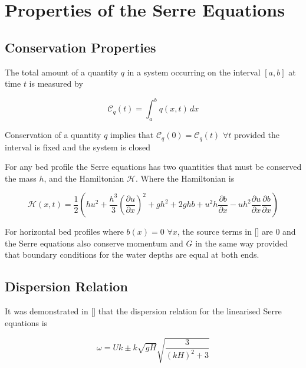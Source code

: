 \section{Properties of the Serre Equations}


\subsection{Conservation Properties}

The total amount of a quantity $q$ in a system occurring on the interval $[a,b]$ at time $t$ is measured by
\begin{defn}
	\label{defn:TotalAmmountab}
	\begin{equation*}
	\mathcal{C}_q(t) = \int_{a}^{b} q(x,t)\, dx
	\end{equation*}
\end{defn}
Conservation of a quantity $q$ implies that $\mathcal{C}_{q}(0) = \mathcal{C}_{q}(t)$ $\forall t$ provided the interval is fixed and the system is closed



For any bed profile the Serre equations has two quantities that must be conserved the mass $h$, and the Hamiltonian $\mathcal{H}$. Where the Hamiltonian is

\begin{defn}
	\label{eqn:Hamildef}
	\begin{equation*}
		\mathcal{H}(x,t) = \frac{1}{2} \left(hu^2 + \frac{h^3}{3} \left(\frac{\partial u}{\partial x}\right)^2 + gh^2 + 2ghb + u^2h\frac{\partial b}{\partial x} - uh^2 \frac{\partial u}{\partial x} \frac{\partial b}{\partial x}  \right)
	\end{equation*}

\end{defn}

For horizontal bed profiles where $b(x) = 0$  $\forall x$, the source terms in [] are $0$ and the Serre equations also conserve momentum and $G$ in the same way provided that boundary conditions for the water depths are equal at both ends.


\subsection{Dispersion Relation}
It was demonstrated in [] that the dispersion relation for the linearised Serre equations is

\begin{equation}
\label{eqn:DispersionRelation}
\omega = Uk \pm k \sqrt{gH} \sqrt{\frac{3}{\left(kH\right)^2 + 3}}
\end{equation}

